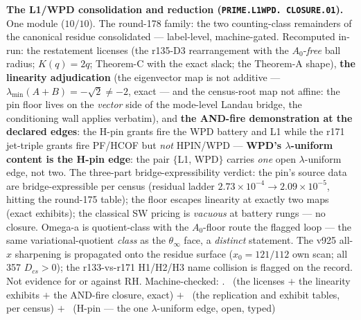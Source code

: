 \par\smallskip\noindent\textbf{The L1/WPD consolidation and
reduction (\texttt{PRIME.\allowbreak L1WPD.\allowbreak
CLOSURE.01}).}
One module ($10/10$).  The round-178 family: the two counting-class
remainders of the canonical residue consolidated --- label-level,
machine-gated.  Recomputed in-run: the restatement licenses (the
r135-D3 rearrangement with the $A_0$-\emph{free} ball radius;
$K(q) = 2q$; Theorem-C with the exact slack; the Theorem-A shape),
\textbf{the linearity adjudication} (the eigenvector map is not
additive --- $\lambda_{\min}(A+B) = -\sqrt{2} \ne -2$, exact ---
and the census-root map not affine: the pin floor lives on the
\emph{vector} side of the mode-level Landau bridge, the
 conditioning wall applies
verbatim), and \textbf{the AND-fire demonstration at the declared
edges}: the H-pin grants fire the WPD battery and L1 while the
r171 jet-triple grants fire PF/HCOF but \emph{not} HPIN/WPD ---
\textbf{WPD's $\lambda$-uniform content is the H-pin edge}: the
pair $\{$L1, WPD$\}$ carries \emph{one} open $\lambda$-uniform
edge, not two.  The three-part bridge-expressibility verdict: the
pin's source data are bridge-expressible per census (residual
ladder $2.73\times10^{-4} \to 2.09\times10^{-5}$, hitting the
round-175 table); the floor escapes linearity at exactly two maps
(exact exhibits); the classical SW pricing is \emph{vacuous} at
battery rungs --- no closure.  Omega-a is quotient-class with the
$A_0$-floor route the flagged loop --- the same variational-quotient
\emph{class} as the $\theta_\infty$ face, a \emph{distinct}
statement.  The v925 all-$x$ sharpening is propagated onto the
residue surface ($x_0 = 121/112$ own scan; all 357 $D_{cs} > 0$);
the r133-vs-r171 H1/H2/H3 name collision is flagged on the record.
Not evidence for or against RH.
Machine-checked: .
\mE\ (the licenses $+$ the linearity exhibits $+$ the AND-fire
closure, exact) $+$ \mC\ (the replication and exhibit tables, per
census) $+$ \mO\ (H-pin --- the one $\lambda$-uniform edge, open,
typed)
\par\smallskip


